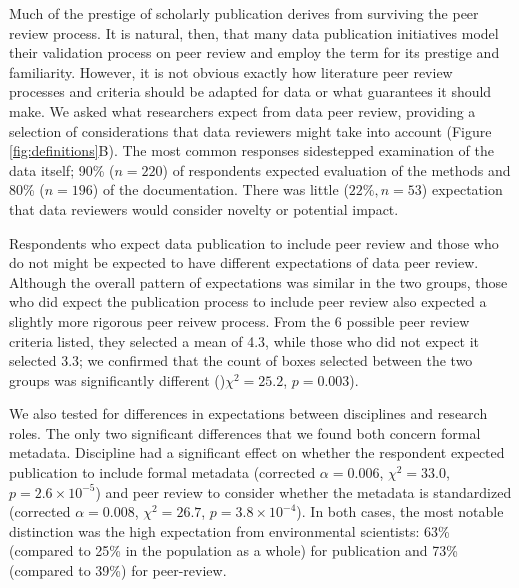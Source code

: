 \documentclass[10pt]{article}
\begin{document}
Much of the prestige of scholarly publication derives from surviving the peer review process.
It is natural, then, that many data publication initiatives model their validation process on peer review and employ the term for its prestige and familiarity.
However, it is not obvious exactly how literature peer review processes and criteria should be adapted for data or what guarantees it should make.
We asked what researchers expect from data peer review, providing a selection of considerations that data reviewers might take into account (Figure \ref{fig:definitions}B).
The most common responses sidestepped examination of the data itself; 90\% ($n=220$) of respondents expected evaluation of the methods and 80\% ($n=196$) of the documentation.
There was little ($22\%, n=53$) expectation that data reviewers would consider novelty or potential impact.

Respondents who expect data publication to include peer review and those who do not might be expected to have different expectations of data peer review. Although the overall pattern of expectations was similar in the two groups, those who did expect the publication process to include peer review also expected a slightly more rigorous peer reivew process. From the 6 possible peer review criteria listed, they selected a mean of 4.3, while those who did not expect it selected 3.3; we confirmed that the count of boxes selected between the two groups was significantly different ()$\chi^{2}= 25.2$, $p= 0.003$). 

We also tested for differences in expectations between disciplines and research roles. The only two significant differences that we found both concern formal metadata. Discipline had a significant effect on whether the respondent expected publication to include formal metadata (corrected $\alpha= 0.006$, $\chi^{2}= 33.0$, $p= 2.6\times10^{-5}$) and peer review to consider whether the metadata is standardized (corrected $\alpha= 0.008$, $\chi^{2}= 26.7$, $p= 3.8\times10^{-4}$). In both cases, the most notable distinction was the high expectation from environmental scientists: 63\% (compared to 25\% in the population as a whole) for publication and 73\% (compared to 39\%) for peer-review.
\end{document}
